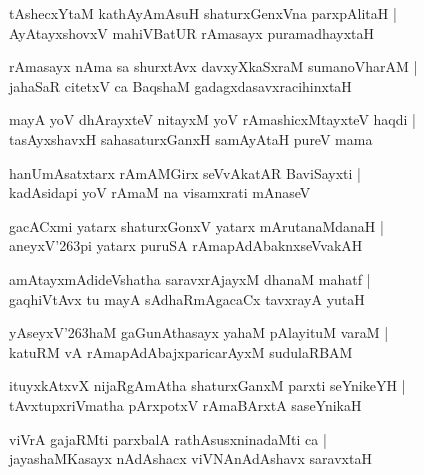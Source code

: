 \documentclass[twoside,12pt,openright]{book}
\def\S{\char'263}
\newcounter{shloka}[chapter]
\begin{document}
\begin{shloka}%
tAshecxYtaM kathAyAmAsuH shaturxGenxVna parxpAlitaH |\\
AyAtayxshovxV mahiVBatUR rAmasayx puramadhayxtaH 
\end{shloka}

\begin{shloka}%
rAmasayx nAma sa shurxtAvx davxyXkaSxraM sumanoVharAM |\\
jahaSaR citetxV ca BaqshaM gadagxdasavxracihinxtaH 
\end{shloka}

\begin{shloka}%
mayA yoV dhArayxteV nitayxM yoV rAmashicxMtayxteV haqdi |\\
tasAyxshavxH sahasaturxGanxH samAyAtaH pureV mama 
\end{shloka}

\begin{shloka}%
hanUmAsatxtarx rAmAMGirx seVvAkatAR BaviSayxti |\\
kadAsidapi yoV rAmaM na visamxrati mAnaseV 
\end{shloka}

\begin{shloka}%
gacACxmi yatarx shaturxGonxV yatarx mArutanaMdanaH |\\
aneyxV\S pi yatarx puruSA rAmapAdAbaknxseVvakAH 
\end{shloka}

\begin{shloka}%
amAtayxmAdideVshatha saravxrAjayxM dhanaM mahatf |\\
gaqhiVtAvx tu mayA sAdhaRmAgacaCx tavxrayA yutaH 
\end{shloka}

\begin{shloka}%
yAseyxV\S haM gaGunAthasayx yahaM pAlayituM varaM |\\
katuRM vA rAmapAdAbajxparicarAyxM sudulaRBAM 
\end{shloka}

\begin{shloka}%
ituyxkAtxvX nijaRgAmAtha shaturxGanxM parxti seYnikeYH |\\
tAvxtupxriVmatha pArxpotxV rAmaBArxtA saseYnikaH 
\end{shloka}

\begin{shloka}%
viVrA gajaRMti parxbalA rathAsusxninadaMti ca |\\
jayashaMKasayx nAdAshacx viVNAnAdAshavx saravxtaH 
\end{shloka}
\end{document}
